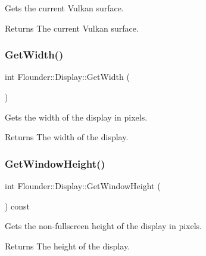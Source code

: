 Gets the current Vulkan surface. 

\begin{DoxyReturn}{Returns}
The current Vulkan surface. 
\end{DoxyReturn}
\mbox{\label{class_flounder_1_1_display_a6aef126ee5b160a8721d9f9961543bac}} 
\subsubsection{\texorpdfstring{Get\+Width()}{GetWidth()}}
{\footnotesize\ttfamily int Flounder\+::\+Display\+::\+Get\+Width (\begin{DoxyParamCaption}{ }\end{DoxyParamCaption})\hspace{0.3cm}{\ttfamily [inline]}}



Gets the width of the display in pixels. 

\begin{DoxyReturn}{Returns}
The width of the display. 
\end{DoxyReturn}
\mbox{\label{class_flounder_1_1_display_a0468b37795b6689013225222927a8015}} 
\subsubsection{\texorpdfstring{Get\+Window\+Height()}{GetWindowHeight()}}
{\footnotesize\ttfamily int Flounder\+::\+Display\+::\+Get\+Window\+Height (\begin{DoxyParamCaption}{ }\end{DoxyParamCaption}) const\hspace{0.3cm}{\ttfamily [inline]}}



Gets the non-\/fullscreen height of the display in pixels. 

\begin{DoxyReturn}{Returns}
The height of the display. 
\end{DoxyReturn}
\mbox{\label{class_flounder_1_1_display_a6c2c98d3d5eba88c6a8c053018d2c1b3}} 
